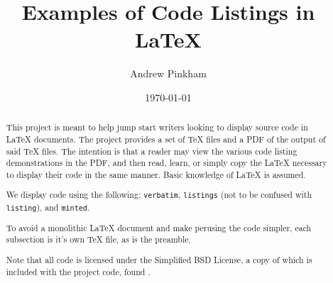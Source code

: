 


\title{Examples of Code Listings in \LaTeX{}}
\author{Andrew Pinkham} %
\date{\today}





\maketitle

\begin{abstract}
This project is meant to help jump start writers looking to display source code in \LaTeX{} documents. The project provides a set of \TeX{} files and a PDF of the output of said \TeX{} files. The intention is that a reader may view the various code listing demonstrations in the PDF, and then read, learn, or simply copy the \LaTeX{} necessary to display their code in the same manner. Basic knowledge of \LaTeX{} is assumed.

We display code using the following: \verb|verbatim|, \verb|listings| (not to be confused with \verb|listing|), and \verb|minted|.

To avoid a monolithic \LaTeX{} document and make perusing the code simpler, each subsection is it's own \TeX{} file, as is the preamble.

Note that all code is licensed under the Simplified BSD License, a copy of which is included with the project code, found .
\end{abstract}


\setlength{\columnseprule}{1pt} %
\begin{multicols}{2} %
\begin{footnotesize} %
\renewcommand\contentsname{\small\centering Contents} %
\tableofcontents
\columnbreak
\renewcommand\listoflistingscaption{\small\centering List of Code Examples} %
\listoflistings
\end{footnotesize}
\end{multicols}

